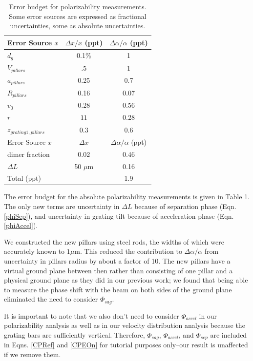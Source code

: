 \documentclass[twocolumn, prl,showpacs,superscriptaddress]{revtex4-1}   %
\newcommand{\eqnref}[1]{Eqn. \ref{#1}}
\newcommand{\sigv}{0.28}
\newcommand{\sigr}{11}
\begin{document}
\begingroup
\begin{table}
\caption{\label{tablePolError}Error budget for polarizability measurements. Some error sources are expressed as fractional uncertainties, some as absolute uncertainties.}
\begin{center}
\begin{tabular}{l c c}
\hline\hline
Error Source $x$ & $\Delta x/x$ (ppt) & $\Delta\alpha/\alpha$ (ppt) \\
\hline
$d_g$ & 0.1\% & 1 \\
$V_{pillars}$ & .5 & 1 \\
$a_{pillars}$ & 0.25 & 0.7 \\
$R_{pillars}$ & 0.16 & 0.07 \\
$v_0$ & $\sigv$ & 0.56 \\
$r$ & $\sigr$ & 0.28 \\
$z_{grating 1,pillars}$ & 0.3 & 0.6 \\
\hline
Error Source $x$ & $\Delta x$ & $\Delta\alpha/\alpha$ (ppt) \\
\hline
dimer fraction & 0.02 & 0.46 \\
$\Delta L$ & 50 $\mu$m & 0.16 \\
\hline
Total (ppt) & & 1.9 \\
\hline\hline
\end{tabular}
\end{center}
\end{table}
\endgroup

The error budget for the absolute polarizability measurements is given in Table \ref{tablePolError}. The only new terms are uncertainty in $\Delta L$ because of separation phase (\eqnref{phiSep}), and uncertainty in grating tilt because of acceleration phase (\eqnref{phiAccel}).

We constructed the new pillars using steel rods, the widths of which were accurately known to $1 \mu \text{m}$. This reduced the contribution to $\Delta\alpha/\alpha$ from uncertainty in pillars radius by about a factor of 10. The new pillars have a virtual ground plane between then rather than consisting of one pillar and a physical ground plane as they did in our previous work; we found that being able to measure the phase shift with the beam on both sides of the ground plane eliminated the need to consider $\Phi_{sag}$. 

It is important to note that we also don't need to consider $\Phi_{accel}$ in our polarizability analysis as well as in our velocity distribution analysis because the grating bars are sufficiently vertical. Therefore, $\Phi_{sag}$, $\Phi_{accel}$, and $\Phi_{sep}$ are included in Eqns. \eqref{CPRef} and \eqref{CPEOn} for tutorial purposes only--our result is unaffected if we remove them.
\end{document}
